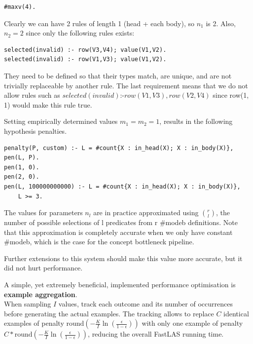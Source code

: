 \begin{example}
\begin{verbatim}
#maxv(4).
\end{verbatim}

Clearly we can have 2 rules of length 1 (head + each body), so $n_1$ is 2.
Also, $n_2 = 2$ since only the following rules exists:
\begin{verbatim}
selected(invalid) :- row(V3,V4); value(V1,V2).
selected(invalid) :- row(V1,V3); value(V1,V2).
\end{verbatim}
They need to be defined so that their types match, are unique, and are not trivially replaceable by another rule.
The last requirement means that we do not allow rules such as $selected(invalid) \text{:-} row(V1, V3), row(V2, V4)$ since row(1, 1) would make this rule true.

Setting empirically determined values $m_1 = m_2 = 1$, results in the following hypothesis penalties.
\begin{lstlisting}
penalty(P, custom) :- L = #count{X : in_head(X); X : in_body(X)}, pen(L, P).
pen(1, 0).
pen(2, 0).
pen(L, 100000000000) :- L = #count{X : in_head(X); X : in_body(X)}, 
    L >= 3.
\end{lstlisting}

The values for parameters $n_l$ are in practice approximated using $\binom{r}{l}$, the number of possible selections of l predicates from r \#modeb definitions.
Note that this approximation is completely accurate when we only have constant \#modeb, which is the case for the concept bottleneck pipeline.

Further extensions to this system should make this value more accurate, but it did not hurt performance.

\end{example}


A simple, yet extremely beneficial, implemented performance optimisation is \textbf{example aggregation}. \\
When sampling $I$ values, track each outcome and its number of occurrences before generating the actual examples.
The tracking allows to replace $C$ identical examples of penalty $\text{round} \left ( -\frac{K}{I} \ln \left ( \frac{\epsilon}{1 - \epsilon} \right ) \right )$ with only one example of penalty $C * \text{round} \left ( -\frac{K}{I} \ln \left ( \frac{\epsilon}{1 - \epsilon} \right ) \right )$, reducing the overall FastLAS running time.


